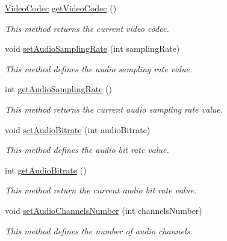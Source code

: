 \begin{DoxyCompactItemize}
\hyperlink{namespacebr_1_1ufscar_1_1lince_1_1xpta_1_1streaming_a0bc6a141499db1ee70a729b694d2dace}{VideoCodec} \hyperlink{classbr_1_1ufscar_1_1lince_1_1xpta_1_1streaming_1_1AVEncoder_a3cf3b06d1d90018ea7d32e56fc5d00f6}{getVideoCodec} ()
\begin{DoxyCompactList}\small\item\em This method returns the current video codec. \item\end{DoxyCompactList}\item 
void \hyperlink{classbr_1_1ufscar_1_1lince_1_1xpta_1_1streaming_1_1AVEncoder_ad26256a91e67d240cba5f520e18f1800}{setAudioSamplingRate} (int samplingRate)
\begin{DoxyCompactList}\small\item\em This method defines the audio sampling rate value. \item\end{DoxyCompactList}\item 
int \hyperlink{classbr_1_1ufscar_1_1lince_1_1xpta_1_1streaming_1_1AVEncoder_a345a87d86daa1c1973f5b55949c00954}{getAudioSamplingRate} ()
\begin{DoxyCompactList}\small\item\em This method returns the current audio sampling rate value. \item\end{DoxyCompactList}\item 
void \hyperlink{classbr_1_1ufscar_1_1lince_1_1xpta_1_1streaming_1_1AVEncoder_a5a837df4be352cddcddba18db8f9823a}{setAudioBitrate} (int audioBitrate)
\begin{DoxyCompactList}\small\item\em This method defines the audio bit rate value. \item\end{DoxyCompactList}\item 
int \hyperlink{classbr_1_1ufscar_1_1lince_1_1xpta_1_1streaming_1_1AVEncoder_a532d23d26f7f20dbb67f00131cbdafe9}{getAudioBitrate} ()
\begin{DoxyCompactList}\small\item\em This method return the current audio bit rate value. \item\end{DoxyCompactList}\item 
void \hyperlink{classbr_1_1ufscar_1_1lince_1_1xpta_1_1streaming_1_1AVEncoder_ad4381d21f0ca4e1e6fc1d0dfb2c4da52}{setAudioChannelsNumber} (int channelsNumber)
\begin{DoxyCompactList}\small\item\em This method defines the number of audio channels. \item\end{DoxyCompactList}\item 

\end{DoxyCompactItemize}
